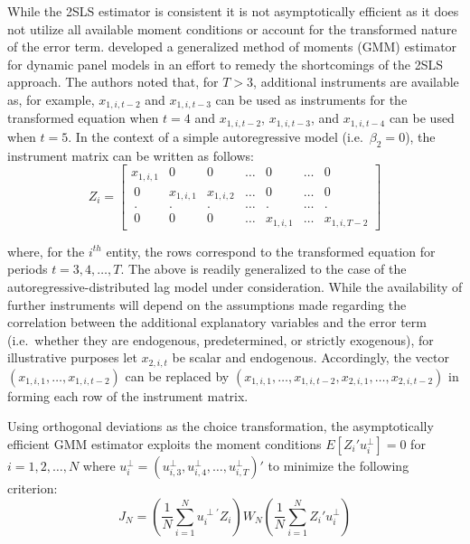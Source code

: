 \documentclass[english]{article}
\begin{document}
While the 2SLS estimator is consistent it is not asymptotically efficient as it does not utilize all available moment conditions or account for the transformed nature of the error term. \citet{arellano1991} developed a generalized method of moments (GMM) estimator for dynamic panel models in an effort to remedy the shortcomings of the 2SLS approach. The authors noted that, for $T>3$, additional instruments are available as, for example, $x_{1,i,t-2}$ and $x_{1,i,t-3}$ can be used as instruments for the transformed equation when $t=4$ and $x_{1,i,t-2}$, $x_{1,i,t-3}$, and  $x_{1,i,t-4}$ can be used when $t=5$. In the context of a simple autoregressive model (i.e.\ $\beta_2=0$), the instrument matrix can be written as follows:
\begin{equation}
Z_i = \left[ 
\begin{array}{ccccccc}
x_{1,i,1} & 0 & 0  & \ldots  & 0 & \ldots & 0 \\\
0 & x_{1,i,1} & x_{1,i,2}  & \ldots  & 0 & \ldots & 0 \\\
. & . & .  & \ldots  & . & \ldots & . \\\
0 & 0 & 0  & \ldots  & x_{1,i,1} & \ldots & x_{1,i,T-2}
\end{array}
\right]
\label{z}
\end{equation}

\noindent
where, for the $i^{th}$ entity, the rows correspond to the transformed equation for periods $t=3,4,\ldots,T$. The above is readily generalized to the case of the autoregressive-distributed lag model under consideration. While the availability of further instruments will depend on the assumptions made regarding the correlation between the additional explanatory variables and the error term (i.e.\ whether they are endogenous, predetermined, or strictly exogenous), for illustrative purposes let $x_{2,i,t}$ be scalar and endogenous. Accordingly, the vector $(x_{1,i,1}, \ldots, x_{1,i,t-2})$ can be replaced by $(x_{1,i,1}, \ldots, x_{1,i,t-2}, x_{2,i,1},\ldots,  x_{2,i,t-2})$ in forming each row of the instrument matrix. 

Using orthogonal deviations as the choice transformation, the asymptotically efficient GMM estimator exploits the moment conditions $E[Z_i' u_i^\perp]=0$ for $i=1,2,\ldots,N$ where $u_i^\perp=(u_{i,3}^\perp, u_{i,4}^\perp, \ldots , u_{i,T}^\perp)'$ to minimize the following criterion:
\begin{equation}
J_N = \left(\frac{1}{N} \sum_{i=1}^N u_{i}^{\perp \prime} Z_i \right) W_N \left(\frac{1}{N} \sum _{i=1}^N Z_i' u_i^\perp \right)
\end{equation}
\end{document}
